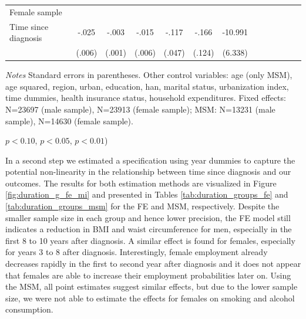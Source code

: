 \begin{table}[h]
\begin{adjustbox}{max width=\linewidth}
\begin{threeparttable}
{\begin{tabular}{l*{6}{S S}}
Female sample &&&&&&\\
Time since diagnosis  & -.025\sym{***}&    -.003\sym{*}  &    -.015\sym{***}&    -.117\sym{**} &    -.166         &  -10.991\sym{*}  \\
                &   (.006)         &   (.001)         &   (.006)         &   (.047)         &   (.124)         &  (6.338)         \\                 
\bottomrule
\end{tabular}
\begin{tablenotes}
\item \textit{Notes} Standard errors in parentheses. Other control variables: age (only MSM), age squared, region, urban, education, han, marital status, urbanization index, time dummies, health insurance status, household expenditures. Fixed effects: N=23697 (male sample), N=23913 (female sample); MSM:  N=13231 (male sample), N=14630 (female sample).
\item \sym{*} \(p<0.10\), \sym{**} \(p<0.05\), \sym{***} \(p<0.01\))
\end{tablenotes}
}
\end{threeparttable}
\end{adjustbox}
\end{table}

\FloatBarrier

In a second step we estimated a specification using year dummies to capture the potential non-linearity in the relationship between time since diagnosis and our outcomes. The results for both estimation methods are visualized in Figure \ref{fig:duration_g_fe_mi} and presented in Tables \ref{tab:duration_groups_fe} and \ref{tab:duration_groups_msm} for the \ac{FE} and \ac{MSM}, respectively. Despite the smaller sample size in each group and hence lower precision, the \ac{FE} model still indicates a reduction in \ac{BMI} and waist circumference for men, especially in the first 8 to 10 years after diagnosis. A similar effect is found for females, especially for years 3 to 8 after diagnosis. Interestingly, female employment already decreases rapidly in the first to second year after diagnosis and it does not appear that females are able to increase their employment probabilities later on. Using the \ac{MSM}, all point estimates suggest similar effects, but due to the lower sample size, we were not able to estimate the effects for females on smoking and alcohol consumption.


